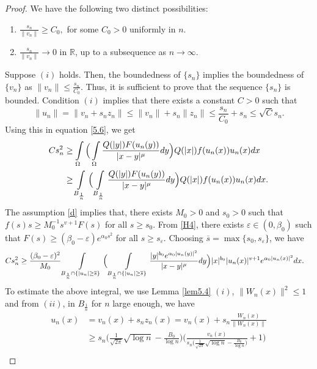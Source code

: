 \documentclass[10pt,a4paper]{amsart}
\newcommand{\R}{\mathbb{R}}
\begin{document}
\begin{proof}
		We have the following two distinct possibilities:
		\begin{enumerate}
			\item [(i)] $\frac{s_n}{\|v_n\|} \geq C_0,$ for some $C_0>0$ uniformly in $n$.
			\item [(ii)] $\frac{s_n}{\|v_n\|} \rightarrow 0$ in $\R$, up to a subsequence as $n \rightarrow \infty$. 
		\end{enumerate}
		Suppose $(i)$ holds. Then, the boundedness of $\{s_n\}$ implies the boundedness of $\{v_n\}$ as $\|v_n\| \leq \frac{s_n}{C_0}.$ Thus, it is sufficient to prove that the sequence $\{s_n\}$ is bounded. Condition $(i)$ implies that there exists a constant $C>0$ such that
		\begin{equation}
			\|u_n\| = \|v_n+s_nz_n\| \leq \|v_n\|+s_n\|z_n\| \leq \frac{s_n}{C_0} + s_n \leq \sqrt{C}s_n. \nonumber
		\end{equation}
		Using this in equation \eqref{5.6}, we get
		\begin{align}
			Cs_n^2 &\geq \int\limits\limits_\Omega \Big( \int\limits\limits_\Omega \frac{Q(|y|)F(u_n(y))}{|x-y|^\mu}dy\Big)Q(|x|)f(u_n(x)) u_n(x)dx \nonumber\\
			& \geq \int\limits\limits_{B_{\frac{1}{n}}} \Big( \int\limits\limits_{B_\frac{1}{n}} \frac{Q(|y|)F(u_n(y))}{|x-y|^\mu}dy\Big) Q(|x|)f(u_n(x))u_n(x)dx. \nonumber
		\end{align}
		The assumption \eqref{d} implies that, there exists $M_0>0$ and $s_0>0$ such that $f(s)s \geq M_0^{-1}s^{v+1} F(s)$ for all $s\geq s_0$. From \eqref{H4}, there exists $\varepsilon \in (0, \beta_0)$ such that $F(s) \geq (\beta_0-\varepsilon)e^{\alpha_0 s^2}$ for all $s \geq s_\varepsilon$. Choosing $\overline{s} = \max\{s_0, s_\varepsilon\}$, we have
		\begin{align}
			Cs_n^2 
			& \geq \frac{ (\beta_0-\varepsilon)^2}{M_0}\int\limits\limits_{B_{\frac{1}{n}} \cap \{ |u_n| \geq \overline{s}\}} \Big( \int\limits\limits_{B_\frac{1}{n} \cap \{ |u_n| \geq \overline{s}\}} \frac{|y|^{b_0}e^{\alpha_0 |u_n(y)|^2}}{|x-y|^\mu} dy\Big) |x|^{b_0}|u_n(x)|^{v+1} e^{\alpha_0 |u_n(x)|^2}dx. \label{5.7}
		\end{align}
		To estimate the above integral, we use Lemma \ref{lem5.4} $(i)$, $\|W_n(x)\|^2 \leq 1$ and from $(ii)$, in $B_{\frac{1}{n}}$ for $n$ large enough, we have
		\begin{align*}
			u_n(x) &= v_n(x) + s_n z_n(x) = v_n(x) + s_n \frac{W_n(x)}{\|W_n(x)\|}\\
			& \geq s_n \Big( \frac{1}{\sqrt{2\pi}}\sqrt{\log{n}} - \frac{B_0}{\log{n}}\Big) \Bigg( \frac{v_n(x)}{s_n\Big(\frac{1}{\sqrt{2\pi}}\sqrt{\log{n}}- \frac{B_0}{\log{n}}\Big)} + 1\Bigg)\\

\end{align*}
\end{proof}
\end{document}

